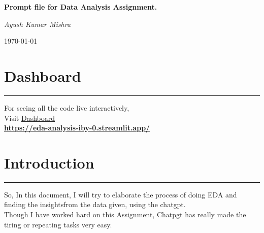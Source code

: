 \documentclass[11pt,a4paper]{article}
\begin{document}
\begin{titlepage}
\centering
{\Huge\bfseries Prompt file for Data Analysis Assignment.\par}
\vspace{2cm}
{\Huge\itshape Ayush Kumar Mishra\par}
\vfill
{\large \today\par}
\end{titlepage}

\newpage
\section*{Dashboard}
  \begin{center}
        \color{red}\rule{1\linewidth}{1mm}
    \end{center}
\begin{center}
\vspace{2in}
    {\Huge  For seeing all the code live interactively, \\
    \vspace{2in}
    Visit  \href{https://eda-analysis-iby-0.streamlit.app/}{Dashboard}}\\
    
    \vspace{0.7in}
   \textbf{ \href{https://eda-analysis-iby-0.streamlit.app/}{https://eda-analysis-iby-0.streamlit.app/}}
\end{center}

\newpage

\tableofcontents

\newpage

\section{Introduction}
\label{sec:intro}


\begin{center}
    \color{red}\rule{1\linewidth}{1mm}
\end{center}

\Large
So, In this document, I will try to elaborate the process of doing EDA and finding the insightsfrom the data given, using the chatgpt.\\
Though I have worked hard on this Assignment, Chatpgt has really made the tiring or repeating tasks very easy.\\
\end{document}

